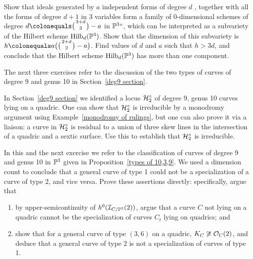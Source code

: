 \begin{exercise}[Iarrobino]\label{bigger component}
Show that ideals generated by $a$ independent forms of degree $d$
,
together with all the forms of degree $d+1$ in 3 variables
form a family of 0-dimensional schemes of degree $d\colonequals
\tbinom{3+d}{3} -a$
in $\PP^3` `$, which can be interpreted as a subvariety
of the Hilbert scheme $\Hilb_d(\PP^3)$. Show that the dimension of this
subvariety is $h \colonequals  a\bigl(\tbinom{2+d}{ 2}-a\bigr)$. Find values of
$d$ and $a$ such that $h>3d$, and conclude that the Hilbert scheme
$\Hilb_d(\PP^3)$ has more than one component.
\end{exercise}

The next three exercises refer to the discussion of the two types of
curves of degree 9 and genus 10 in Section~\ref{deg9 section}.

\begin{exercise}\label{degree 9 type 2 is irreducible}
In Section~\ref{deg9 section} we identified a locus $\cH^\circ_2$ of
degree 9, genus 10 curves lying on a quadric.
One can show that $\cH^\circ_2$  is irreducible by a monodromy argument
using Example~\ref{monodromy of rulings}, but one can also prove it via
a liaison:  a curve in $\cH^\circ_2$ is residual to a union of three
skew lines in the intersection of a quadric and a sextic surface. Use
this to establish that $\cH^\circ_2$ is irreducible.
\end{exercise}

\begin{exercise}
 In this and the next exercise we refer to the classification of curves
 of degree 9 and genus 10 in $\PP^3$ given in Proposition~\ref{types
 of 10,3,9}. We used a dimension count to conclude that a general curve
 of type 1 could not be a specialization of a curve of type 2, and vice
 versa. Prove these assertions directly: specifically, argue that
\begin{enumerate}
\item by upper-semicontinuity of $h^0(\cI_{C/\PP^3}(2))$, argue that a
curve $C$ not lying on a quadric cannot be the specialization of curves
$C_t$ lying on quadrics; and
\item show that for a general curve of type $(3,6)$ on a quadric, $K_C
\not\cong \cO_C(2)$, and deduce that a general curve of type 2 is not
a specialization of curves of type 1.
\end{enumerate}
\end{exercise}

